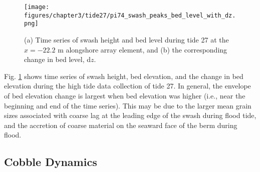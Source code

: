 %

\begin{figure}[tbp] %
  	\texttt{[image: figures/chapter3/tide27/pi74\_swash\_peaks\_bed\_level\_with\_dz.png]}
 	\caption[Time series of swash zone bed level and change in bed level]{(a) Time series of swash height and bed level during tide 27 at the $x=-22.2$ m alongshore array element, and (b) the corresponding change in bed level, d$z$.}
 	\label{fig:bed_level_change_pi74}
\end{figure}

Fig. \ref{fig:bed_level_change_pi74} shows time series of swash height, bed elevation, and the change in bed elevation during the high tide data collection of tide 27. In general, the envelope of bed elevation change is largest when bed elevation was higher (i.e., near the beginning and end of the time series). This may be due to the larger mean grain sizes associated with coarse lag at the leading edge of the swash during flood tide, and the accretion of coarse material on the seaward face of the berm during flood.



\subsection{Cobble Dynamics}

